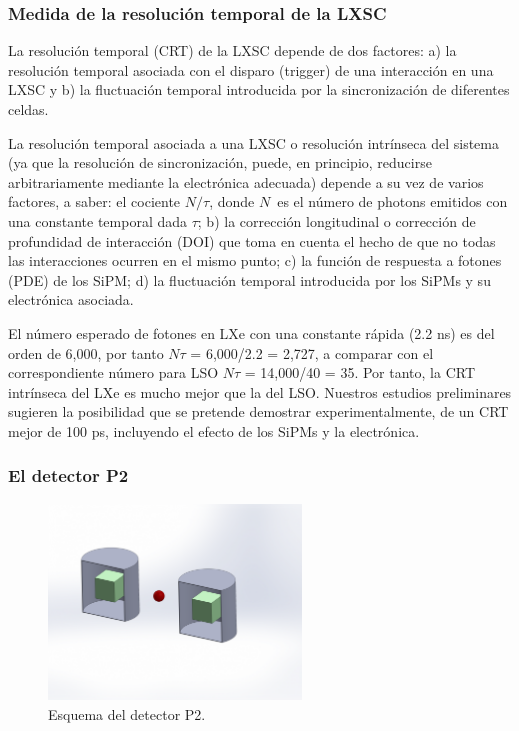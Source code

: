 \subsubsection*{Medida de la resolución temporal de la LXSC}

La resolución temporal (CRT) de la LXSC depende de dos factores: a) la resolución temporal asociada con el disparo (trigger) de una interacción en una LXSC y b) la fluctuación temporal introducida por la sincronización de diferentes celdas.

La resolución temporal asociada a una LXSC o resolución intrínseca del sistema (ya que la resolución de sincronización, puede, en principio, reducirse arbitrariamente mediante la electrónica adecuada) depende a su vez de varios factores, a saber: el cociente $N/\tau$, donde $N$~es el número de photons emitidos con una constante temporal dada $\tau$; b) la corrección longitudinal o corrección de profundidad de interacción (DOI) que toma en cuenta el hecho de que no todas las interacciones ocurren en el mismo punto; c) la función de respuesta a fotones (PDE) de los SiPM; d) la fluctuación temporal introducida por los SiPMs y su electrónica asociada. 

El número esperado de fotones en LXe con una constante rápida (2.2 ns) es del orden de 6,000, por tanto  $N\tau$ = 6,000/2.2 = 2,727, a comparar con el correspondiente número para LSO $N\tau$ = 14,000/40 = 35. Por tanto, la CRT intrínseca del LXe es mucho mejor que la del LSO.  Nuestros estudios preliminares sugieren la posibilidad que se pretende demostrar experimentalmente, de un CRT  mejor de 100 ps, incluyendo el efecto de los SiPMs y la electrónica. 

\subsubsection*{El detector P2}

\begin{figure}
\centering
\includegraphics[width=0.6\textwidth]{img/P2.png}
\caption{\small Esquema del detector P2.} \label{fig.P2}
\end{figure} 

